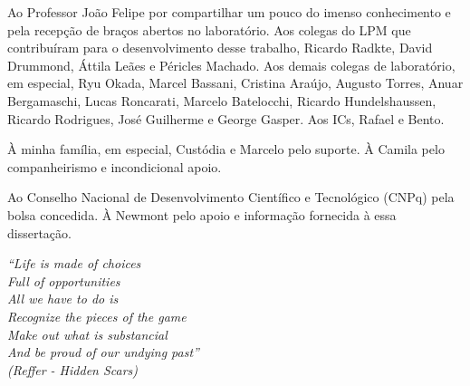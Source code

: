 \documentclass[
	12pt,				%
	openright,			%
	twoside,			%
	a4paper,			%
	english,			%
	french,				%
	spanish,			%
	brazil				%
	]{abntex2}
\begin{document}
\begin{agradecimentos}

Ao Professor João Felipe por compartilhar um pouco do imenso conhecimento e pela recepção de braços abertos no laboratório. Aos colegas do LPM que contribuíram para o desenvolvimento desse trabalho, Ricardo Radkte, David Drummond, Áttila Leães e Péricles Machado. Aos demais colegas de laboratório, em especial, Ryu Okada, Marcel Bassani, Cristina Araújo, Augusto Torres, Anuar Bergamaschi, Lucas Roncarati, Marcelo Batelocchi, Ricardo Hundelshaussen, Ricardo Rodrigues, José Guilherme e George Gasper. Aos ICs, Rafael e Bento.

À minha família, em especial, Custódia e Marcelo pelo suporte. À Camila pelo companheirismo e incondicional apoio.

Ao Conselho Nacional de Desenvolvimento Científico e Tecnológico (CNPq) pela bolsa concedida. À Newmont pelo apoio e informação fornecida à essa dissertação.

\end{agradecimentos}

\begin{epigrafe}
    \vspace*{\fill}
	\begin{flushright}
		\textit{``Life is made of choices \\
		Full of opportunities \\
		All we have to do is \\
		Recognize the pieces of the game\\
        Make out what is substancial\\
        And be proud of our undying past''\\
		(Reffer - Hidden Scars)}
	\end{flushright}
\end{epigrafe}

\end{document}
